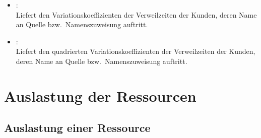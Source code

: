 \begin{itemize}
\item
{}:\\
Liefert den Variationskoeffizienten der Verweilzeiten der Kunden, deren Name an Quelle bzw.\ Namenszuweisung  auftritt.

\item
{}:\\
Liefert den quadrierten Variationskoeffizienten der Verweilzeiten der Kunden, deren Name an Quelle bzw.\ Namenszuweisung  auftritt.

\end{itemize}  



\section{Auslastung der Ressourcen}



\subsection{Auslastung einer Ressource}

